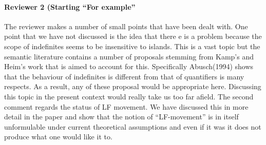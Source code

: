 \documentclass[11pt]{article}
\begin{document}
\paragraph{Reviewer 2 (Starting ``For example''}  The reviewer makes a number of small points that have been dealt with.  One point that we have not discussed is the idea that there e is a problem because the scope of indefinites seems to be insensitive to islands.  This is a vast topic but the semantic literature contains a number of proposals stemming from Kamp's and Heim's work that is aimed to account for this.  Specifically Abusch(1994) shows that the behaviour of indefinites is different from that of quantifiers is many respects.  As a result, any of these proposal would be appropriate here.  Discussing this topic in the present context would really take us too far afield.
The second comment regards the status of LF movement.  We have discussed this in more detail in the paper and show that the notion of ``LF-movement'' is in itself unformulable under current theoretical assumptions and even if it was it does not produce what one would like it to.
\end{document}
